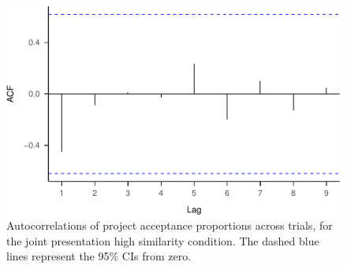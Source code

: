 \documentclass[
  english,
  man, donotrepeattitle,floatsintext]{apa7}
\begin{document}
\begin{figure}
\centering
\includegraphics{aggregation_trials_files/figure-latex/acf-joint-high-1.pdf}
\caption{\label{fig:acf-joint-high}Autocorrelations of project acceptance proportions across trials, for the joint presentation high similarity condition. The dashed blue lines represent the 95\% CIs from zero.}
\end{figure}
\end{document}
